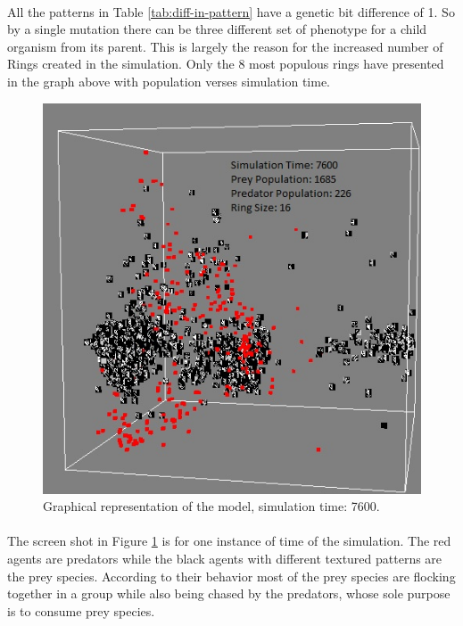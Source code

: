 \paragraph{}
All the patterns in Table \ref{tab:diff-in-pattern} have a genetic bit difference of 1. So by a single mutation there can be three different set of phenotype for a child organism from its parent. This is largely the reason for the increased number of Rings created in the simulation. Only the 8 most populous rings have presented in the graph above with population verses simulation time.

\begin{figure}
	\centering
	\label{fig:screenshot-simTime7600-2-prey}
	\includegraphics[scale=0.65]{images/simTime7600}
	\caption{Graphical representation of the model, simulation time: 7600.}
\end{figure}

\paragraph{}
The screen shot in Figure \ref{fig:screenshot-simTime7600-2-prey} is for one instance of time of the simulation. The red agents are predators while the black agents with different textured patterns are the prey species. According to their behavior most of the prey species are flocking together in a group while also being chased by the predators, whose sole purpose is to consume prey species. 

